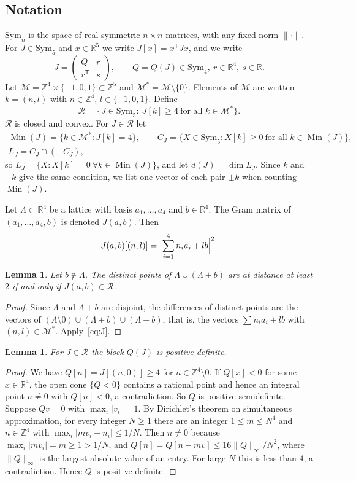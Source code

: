 \documentclass[11pt]{amsart}
\newtheorem{lemma}[theorem]{Lemma}
\theoremstyle{definition}
\theoremstyle{remark}
\numberwithin{equation}{section}
\numberwithin{table}{section}
\numberwithin{figure}{section}
\newcommand{\R}{\mathbb{R}}
\newcommand{\Z}{\mathbb{Z}}
\newcommand{\M}{\mathcal{M}}
\newcommand{\Rk}{\mathcal{R}}
\newcommand{\Sym}{\mathrm{Sym}}
\newcommand{\Min}{\operatorname{Min}}
\begin{document}
\subsection{Notation}
$\Sym_n$ is the space of real symmetric $n\times n$ matrices, with any fixed norm $\|\cdot\|$. For $J\in\Sym_5$ and $x\in\R^5$ we write $J[x]=x^{\mathsf T}Jx$, and we write
\[
J=\begin{pmatrix}Q&r\\ r^{\mathsf T}&s\end{pmatrix},\qquad Q=Q(J)\in\Sym_4,\ r\in\R^4,\ s\in\R .
\]
Let $\M=\Z^4\times\{-1,0,1\}\subset\Z^5$ and $\M^*=\M\setminus\{0\}$. Elements of $\M$ are written $k=(n,l)$ with $n\in\Z^4$, $l\in\{-1,0,1\}$. Define
\[
\Rk=\{J\in\Sym_5:\ J[k]\ge4\ \text{for all }k\in\M^*\}.
\]
$\Rk$ is closed and convex. For $J\in\Rk$ let
\begin{gather*}
\Min(J)=\{k\in\M^*:J[k]=4\},\qquad C_J=\{X\in\Sym_5: X[k]\ge0\ \text{for all } k\in\Min(J)\},\\
L_J=C_J\cap(-C_J),
\end{gather*}
so $L_J=\{X:X[k]=0\ \forall k\in\Min(J)\}$, and let $d(J)=\dim L_J$. Since $k$ and $-k$ give the same condition, we list one vector of each pair $\pm k$ when counting $\Min(J)$.

Let $\Lambda\subset\R^4$ be a lattice with basis $a_1,\dots,a_4$ and $b\in\R^4$. The Gram matrix of $(a_1,\dots,a_4,b)$ is denoted $J(a,b)$. Then
\begin{equation}\label{eq:J}
J(a,b)[(n,l)]=\Bigl|\sum_{i=1}^4 n_ia_i+lb\Bigr|^2 .
\end{equation}

\begin{lemma}\label{lem:packing}
Let $b\notin\Lambda$. The distinct points of $\Lambda\cup(\Lambda+b)$ are at distance at least $2$ if and only if $J(a,b)\in\Rk$.
\end{lemma}

\begin{proof}
Since $\Lambda$ and $\Lambda+b$ are disjoint, the differences of distinct points are the vectors of $(\Lambda\setminus0)\cup(\Lambda+b)\cup(\Lambda-b)$, that is, the vectors $\sum n_ia_i+lb$ with $(n,l)\in\M^*$. Apply~\eqref{eq:J}.
\end{proof}

\begin{lemma}\label{lem:pd}
For $J\in\Rk$ the block $Q(J)$ is positive definite.
\end{lemma}

\begin{proof}
We have $Q[n]=J[(n,0)]\ge4$ for $n\in\Z^4\setminus0$. If $Q[x]<0$ for some $x\in\R^4$, the open cone $\{Q<0\}$ contains a rational point and hence an integral point $n\ne0$ with $Q[n]<0$, a contradiction. So $Q$ is positive semidefinite. Suppose $Qv=0$ with $\max_i|v_i|=1$. By Dirichlet's theorem on simultaneous approximation, for every integer $N\ge1$ there are an integer $1\le m\le N^4$ and $n\in\Z^4$ with $\max_i|mv_i-n_i|\le1/N$. Then $n\ne0$ because $\max_i|mv_i|=m\ge1>1/N$, and $Q[n]=Q[n-mv]\le16\|Q\|_{\infty}/N^2$, where $\|Q\|_\infty$ is the largest absolute value of an entry. For large $N$ this is less than $4$, a contradiction. Hence $Q$ is positive definite.
\end{proof}
\end{document}
